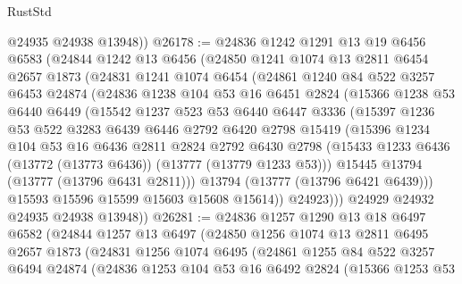 \begin{lexlean}{RustStd}
\begin{coremodule}
        @24935
        @24938
        @13948))
@26178 := @24836
    @1242
    @1291
    @13
    @19
    @6456
    @6583
    (@24844
      @1242
      @13
      @6456
      (@24850
        @1241
        @1074
        @13
        @2811
        @6454
        @2657
        @1873
        (@24831
          @1241
          @1074
          @6454
          (@24861
            @1240
            @84
            @522
            @3257
            @6453
            @24874
            (@24836
              @1238
              @104
              @53
              @16
              @6451
              @2824
              (@15366
                @1238
                @53
                @6440
                @6449
                (@15542
                  @1237
                  @523
                  @53
                  @6440
                  @6447
                  @3336
                  (@15397
                    @1236
                    @53
                    @522
                    @3283
                    @6439
                    @6446
                    @2792
                    @6420
                    @2798
                    @15419
                    (@15396
                      @1234
                      @104
                      @53
                      @16
                      @6436
                      @2811
                      @2824
                      @2792
                      @6430
                      @2798
                      (@15433 @1233 @6436 (@13772 (@13773 @6436)) (@13777 (@13779 @1233 @53)))
                      @15445
                      @13794
                      (@13777 (@13796 @6431 @2811)))
                    @13794
                    (@13777 (@13796 @6421 @6439)))
                  @15593
                  @15596
                  @15599
                  @15603
                  @15608
                  @15614))
              @24923)))
        @24929
        @24932
        @24935
        @24938
        @13948))
@26281 := @24836
    @1257
    @1290
    @13
    @18
    @6497
    @6582
    (@24844
      @1257
      @13
      @6497
      (@24850
        @1256
        @1074
        @13
        @2811
        @6495
        @2657
        @1873
        (@24831
          @1256
          @1074
          @6495
          (@24861
            @1255
            @84
            @522
            @3257
            @6494
            @24874
            (@24836
              @1253
              @104
              @53
              @16
              @6492
              @2824
              (@15366
                @1253
                @53

\end{coremodule}
\end{lexlean}
